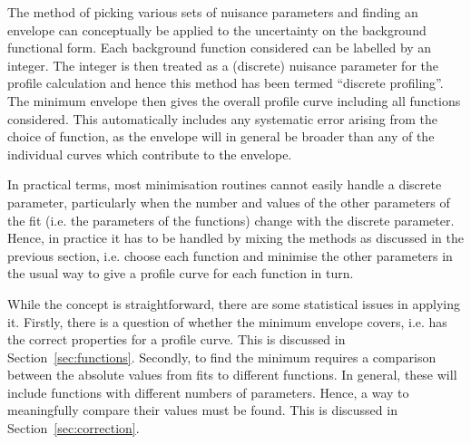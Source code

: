 The method of picking various sets of nuisance parameters and finding
an envelope can conceptually be applied to the uncertainty on the background functional form. 
Each background function considered can be labelled by an
integer. The integer is then treated as a (discrete) nuisance parameter
for the profile calculation and hence this method has been termed
``discrete profiling''.
The minimum envelope then gives the overall profile curve including
all functions considered. This automatically includes any systematic error
arising from the choice of function, as the envelope will in general be broader
than any of the individual curves which contribute to the envelope.

In practical terms, most minimisation routines 
cannot easily handle a discrete parameter, particularly when the
number and values of the other parameters of the fit (i.e. the parameters
of the functions) change with the discrete parameter.
Hence, in practice it has
to be handled by mixing the methods as discussed in the previous section,
i.e. choose each function and minimise
the other parameters in the usual way to give a profile curve for each function
in turn. 

While the concept is straightforward, there are some statistical
issues in applying it.
Firstly, there is a question of whether the \nll minimum envelope covers,
i.e. has the correct properties for a profile curve.
This is discussed in Section~\ref{sec:functions}.
Secondly, to find the minimum requires a
comparison between the absolute \nll values from fits to different functions.
In general, these will include functions with different numbers of parameters.
Hence, a way to meaningfully compare their \nll values must be found.
This is discussed in Section~\ref{sec:correction}.
